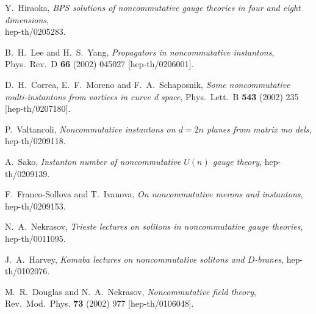 \documentclass[a4paper,11pt,english]{article}
\numberwithin{equation}{section}
\renewcommand{\=}{\ =\ }
\begin{document}
\begin{thebibliography}{99}
         Y.~Hiraoka,
         {\em BPS solutions of noncommutative gauge theories in four and %
eight dimensions},\\
         hep-th/0205283.

         B.~H.~Lee and H.~S.~Yang,
         {\em Propagators in noncommutative instantons},\\
         Phys.\ Rev.\ D {\bf 66} (2002) 045027
         [hep-th/0206001].

         D.~H.~Correa, E.~F.~Moreno and F.~A.~Schaposnik,
         {\em Some noncommutative multi-instantons from vortices in curve%
d space},
         Phys.\ Lett.\ B {\bf 543} (2002) 235
         [hep-th/0207180].

         P.~Valtancoli,
         {\em Noncommutative instantons on $d{=}2n$ planes from matrix mo%
dels},\\
         hep-th/0209118.

         A.~Sako,
         {\em Instanton number of noncommutative $U(n)$ gauge theory},
         hep-th/0209139.

         F.~Franco-Sollova and T.~Ivanova,
         {\em On noncommutative merons and instantons},\\
         hep-th/0209153.

         N.~A.~Nekrasov,
         {\em Trieste lectures on solitons in noncommutative gauge theories},\\
         hep-th/0011095.

         J.~A.~Harvey,
         {\em Komaba lectures on noncommutative solitons and $D$-branes},
         hep-th/0102076.

         M.~R.~Douglas and N.~A.~Nekrasov,
         {\em Noncommutative field theory},\\
         Rev.\ Mod.\ Phys.  {\bf 73} (2002) 977
         [hep-th/0106048].


\end{thebibliography}
\end{document}

